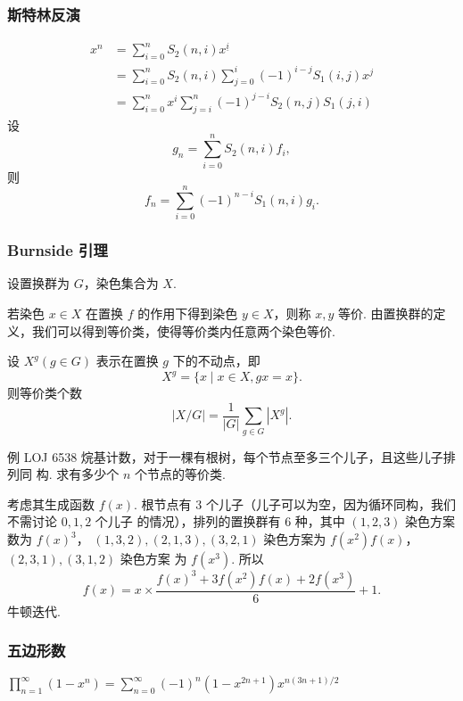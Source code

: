 \subsubsection{斯特林反演}
\begin{equation*}
    \begin{aligned}
        x^n &= \sum_{i=0}^n S_2(n, i) x^{\underline{i}} \\
        &= \sum_{i=0}^n S_2(n, i) \sum_{j=0}^i (-1)^{i-j} S_1(i, j) x^j \\
        &= \sum_{i=0}^n x^i \sum_{j=i}^n (-1)^{j-i} S_2(n, j) S_1(j, i)
    \end{aligned}
\end{equation*}
\noindent 设
\begin{equation*}
    g_n = \sum_{i=0}^n S_2(n, i) f_i,
\end{equation*}
\noindent 则
\begin{equation*}
    f_n = \sum_{i=0}^n (-1)^{n-i} S_1(n, i) g_i.
\end{equation*}

\subsubsection{Burnside 引理}
\hspace{\parindent}设置换群为 $G$，染色集合为 $X$.

若染色 $x \in X$ 在置换 $f$ 的作用下得到染色 $y \in X$，则称 $x, y$ 等价.
由置换群的定义，我们可以得到等价类，使得等价类内任意两个染色等价.

设 $X^g (g \in G)$ 表示在置换 $g$ 下的不动点，即
$$
X^g = \{x \mid x \in X, gx = x\}.
$$
则等价类个数
$$
|X / G| = \frac{1}{|G|} \sum_{g \in G} |X^g|.
$$

例 LOJ 6538 烷基计数，对于一棵有根树，每个节点至多三个儿子，且这些儿子排列同
构. 求有多少个 $n$ 个节点的等价类.

考虑其生成函数 $f(x)$.
根节点有 $3$ 个儿子（儿子可以为空，因为循环同构，我们不需讨论 $0, 1, 2$ 个儿子
的情况），排列的置换群有 $6$ 种，其中 $(1,2,3)$ 染色方案数为 $f(x)^3$，
$(1,3,2),(2,1,3),(3,2,1)$ 染色方案为 $f(x^2)f(x)$，$(2,3,1),(3,1,2)$ 染色方案
为 $f(x^3)$. 所以
$$
f(x) = x \times \frac{f(x)^3+3f(x^2)f(x)+2f(x^3)}{6}+1.
$$
牛顿迭代.

\subsubsection{五边形数}
$
    \prod_{n=1}^{\infty}{(1-x^{n})}=\sum_{n=0}^{\infty}{(-1)^{n}(1-x^{2n+1})x^{n(3n+1)/2}}
$
